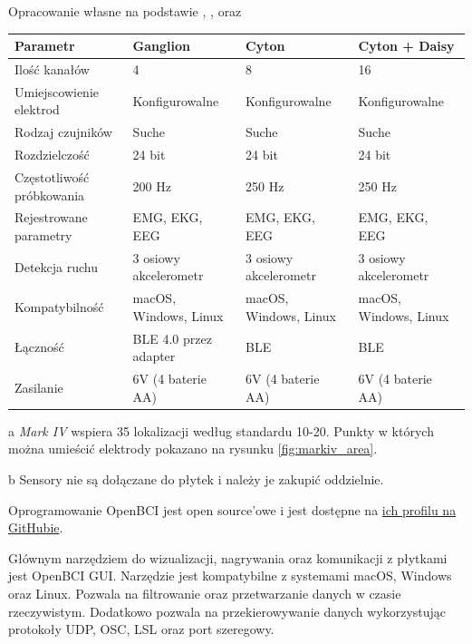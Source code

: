 \documentclass[skorowidz,skroty]{dyplomWEZUT}
\begin{document}
{Opracowanie własne na podstawie \cite{markiv_shop}, \cite{ganglion_shop},\cite{cyton_shop} oraz \cite{cytondaisy_shop}}
{
    \begin{threeparttable}
        \begin{tabular}{l|l|l|l}
            Parametr & Ganglion & Cyton & Cyton + Daisy \\\hline\hline
            Ilość kanałów & 4 & 8 & 16\\
            Umiejscowienie elektrod & Konfigurowalne\tnote{a} & Konfigurowalne\tnote{a} & Konfigurowalne\tnote{a}\\
            Rodzaj czujników & Suche & Suche & Suche\\
            Rozdzielczość & 24 bit & 24 bit & 24 bit\\
            Częstotliwość próbkowania & 200 Hz & 250 Hz & 250 Hz\\
            Rejestrowane parametry & EMG, EKG, EEG\tnote{b} & EMG, EKG, EEG\tnote{b}  & EMG, EKG, EEG\tnote{b}\\
            Detekcja ruchu & 3 osiowy akcelerometr & 3 osiowy akcelerometr & 3 osiowy akcelerometr\\
            Kompatybilność & macOS, Windows, Linux & macOS, Windows, Linux & macOS, Windows, Linux\\
            Łączność & BLE 4.0 przez adapter & BLE & BLE\\
            Zasilanie & 6V (4 baterie AA) & 6V (4 baterie AA) & 6V (4 baterie AA)\\
        \end{tabular}
        \begin{tablenotes}
            \item[a] \footnotesize \textit{Mark IV} wspiera 35 lokalizacji według standardu 10-20. Punkty w których można umieścić elektrody pokazano na rysunku \vref{fig:markiv_area}.
            \item[b] \footnotesize Sensory nie są dołączane do płytek i należy je zakupić oddzielnie.
        \end{tablenotes}
    \end{threeparttable}
}

Oprogramowanie OpenBCI jest open source'owe i jest dostępne na \href{https://github.com/OpenBCI}{ich profilu na GitHubie}.

Głównym narzędziem do wizualizacji, nagrywania oraz komunikacji z płytkami jest OpenBCI GUI\cite{markiv_software_gui}. Narzędzie jest kompatybilne z systemami macOS, Windows oraz Linux. Pozwala na filtrowanie oraz przetwarzanie danych w czasie rzeczywistym. Dodatkowo pozwala na przekierowywanie danych wykorzystując protokoły UDP, OSC, LSL oraz port szeregowy.
\end{document}
